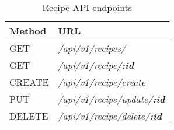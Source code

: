 \begin{table}[!h]
    \centering
    \caption{Recipe API endpoints}
    \label{tab:recipe-api}
    \begin{tabular}{|l|p{29em}|}
        \hline
        \textbf{Method} & \textbf{URL} \\
        \hline
        GET & \textit{/api/v1/recipes/} \\
        \hline
        GET & \textit{/api/v1/recipe/\textbf{:id}} \\
        \hline
        CREATE & \textit{/api/v1/recipe/create} \\
        \hline
        PUT & \textit{/api/v1/recipe/update/\textbf{:id}} \\
        \hline
        DELETE & \textit{/api/v1/recipe/delete/\textbf{:id}} \\
        \hline
    \end{tabular}
\end{table}
